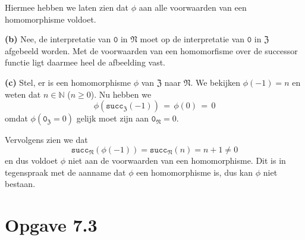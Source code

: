 \documentclass[a4paper,11pt]{article}
\begin{document}
\begin{description}
\begin{itemize}
\end{itemize}

Hiermee hebben we laten zien dat $\phi$ aan alle voorwaarden van een
homomorphisme voldoet.

\item{\bf (b)} %
Nee, de interpretatie van $\texttt{0}$ in $\mathfrak{N}$ moet op de
interpretatie van $\texttt{0}$ in $\mathfrak{Z}$ afgebeeld worden. Met de
voorwaarden van een homomorfisme over de successor functie ligt daarmee heel
de afbeelding vast.

\item{\bf (c)} %
Stel, er is een homomorphisme $\phi$ van $\mathfrak{Z}$ naar
$\mathfrak{N}$. We bekijken $\phi(-1)=n$ en weten dat $n \in \mathbb{N}$ ($n
\ge 0$). Nu hebben we
\begin{displaymath}
\phi(\texttt{succ}_{\mathfrak{Z}}(-1)) \, = \, \phi(0) \, = \, 0
\end{displaymath}
omdat $\phi(\texttt{0}_{\mathfrak{Z}}=0)$ gelijk moet zijn aan
$\texttt{0}_{\mathfrak{N}} = 0$.

Vervolgens zien we dat
\begin{displaymath}
\texttt{succ}_{\mathfrak{N}}(\phi(-1)) = \texttt{succ}_{\mathfrak{N}}(n) = n+1 \ne 0
\end{displaymath}
en dus voldoet $\phi$ niet aan de voorwaarden van een homomorphisme. Dit is in
tegenspraak met de aanname dat $\phi$ een homomorphisme is, dus kan $\phi$ niet
bestaan.

\end{description}


\section*{Opgave 7.3}
\end{document}
